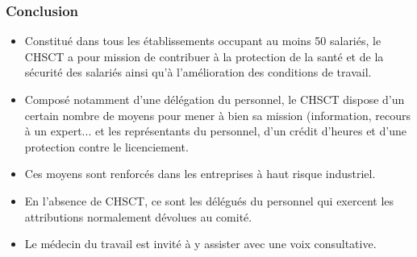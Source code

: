 \documentclass{beamer}
\begin{document}
\begin{frame}
\frametitle{Conclusion}

\begin{itemize}
\item Constitué dans tous les établissements occupant au moins 50 salariés, le CHSCT a pour mission de contribuer à la protection de la santé et de la sécurité des salariés ainsi qu'à l'amélioration des conditions de travail. 

\item Composé notamment d'une délégation du personnel, le CHSCT dispose d'un certain nombre de moyens pour mener à bien sa mission (information, recours à un expert...  et les représentants du personnel, d'un crédit d'heures et d'une protection contre le licenciement. 

\item Ces moyens sont renforcés dans les entreprises à haut risque industriel. 

\item En l'absence de CHSCT, ce sont les délégués du personnel qui exercent les attributions normalement dévolues au comité. 

\item Le médecin du travail est invité à y assister avec une voix consultative.
\end{itemize}
\end{frame}
\end{document}
